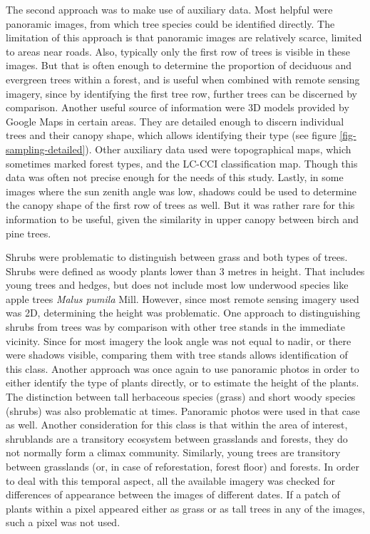 \documentclass[a4paper,10pt]{book}
\begin{document}
The second approach was to make use of auxiliary data. Most helpful were panoramic images, from which tree species could be identified directly. The limitation of this approach is that panoramic images are relatively scarce, limited to areas near roads. Also, typically only the first row of trees is visible in these images. But that is often enough to determine the proportion of deciduous and evergreen trees within a forest, and is useful when combined with remote sensing imagery, since by identifying the first tree row, further trees can be discerned by comparison. Another useful source of information were 3D models provided by Google Maps in certain areas. They are detailed enough to discern individual trees and their canopy shape, which allows identifying their type (see figure \ref{fig-sampling-detailed}). Other auxiliary data used were topographical maps, which sometimes marked forest types, and the LC-CCI classification map. Though this data was often not precise enough for the needs of this study. Lastly, in some images where the sun zenith angle was low, shadows could be used to determine the canopy shape of the first row of trees as well. But it was rather rare for this information to be useful, given the similarity in upper canopy between birch and pine trees.

Shrubs were problematic to distinguish between grass and both types of trees. Shrubs were defined as woody plants lower than 3 metres in height. That includes young trees and hedges, but does not include most low underwood species like apple trees \textit{Malus pumila} Mill. However, since most remote sensing imagery used was 2D, determining the height was problematic. One approach to distinguishing shrubs from trees was by comparison with other tree stands in the immediate vicinity. Since for most imagery the look angle was not equal to nadir, or there were shadows visible, comparing them with tree stands allows identification of this class. Another approach was once again to use panoramic photos in order to either identify the type of plants directly, or to estimate the height of the plants. The distinction between tall herbaceous species (grass) and short woody species (shrubs) was also problematic at times. Panoramic photos were used in that case as well. Another consideration for this class is that within the area of interest, shrublands are a transitory ecosystem between grasslands and forests, they do not normally form a climax community. Similarly, young trees are transitory between grasslands (or, in case of reforestation, forest floor) and forests. In order to deal with this temporal aspect, all the available imagery was checked for differences of appearance between the images of different dates. If a patch of plants within a pixel appeared either as grass or as tall trees in any of the images, such a pixel was not used.
\end{document}

